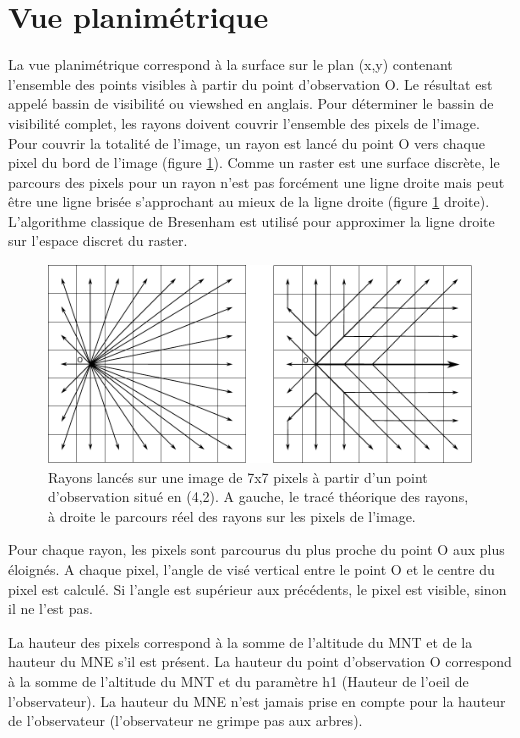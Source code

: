 \documentclass{report}
\begin{document}
\section{Vue planimétrique}
La vue planimétrique correspond à la surface sur le plan (x,y) contenant l'ensemble des points visibles à partir du point d'observation O. Le résultat est appelé bassin de visibilité ou viewshed en anglais.
Pour déterminer le bassin de visibilité complet, les rayons doivent couvrir l'ensemble des pixels de l'image.
Pour couvrir la totalité de l'image, un rayon est lancé du point O vers chaque pixel du bord de l'image (figure \ref{grid}). Comme un raster est une surface discrète, le parcours des pixels pour un rayon n'est pas forcément une ligne droite mais peut être une ligne brisée s'approchant au mieux de la ligne droite (figure \ref{grid} droite). L'algorithme classique de Bresenham est utilisé pour approximer la ligne droite sur l'espace discret du raster.

\begin{figure}[H]
	\includegraphics[scale=0.8]{img/grid.pdf} 
	\caption{Rayons lancés sur une image de 7x7 pixels à partir d'un point d'observation situé en (4,2). A gauche, le tracé théorique des rayons, à droite le parcours réel des rayons sur les pixels de l'image.}
	\label{grid}
\end{figure}

Pour chaque rayon, les pixels sont parcourus du plus proche du point O aux plus éloignés. A chaque pixel, l'angle de visé vertical entre le point O et le centre du pixel est calculé. Si l'angle est supérieur aux précédents, le pixel est visible, sinon il ne l'est pas. 

La hauteur des pixels correspond à la somme de l'altitude du MNT et de la hauteur du MNE s'il est présent. La hauteur du point d'observation O correspond à la somme de l'altitude du MNT et du paramètre h1 (Hauteur de l'oeil de l'observateur). La hauteur du MNE n'est jamais prise en compte pour la hauteur de l'observateur (l'observateur ne grimpe pas aux arbres).
\end{document}
